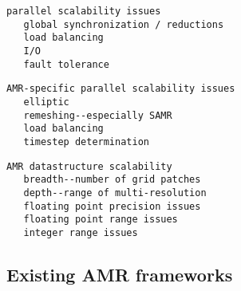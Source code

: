 \documentclass[14pt,letter]{article}
\begin{document}

\begin{verbatim}
parallel scalability issues
   global synchronization / reductions
   load balancing
   I/O
   fault tolerance
\end{verbatim}

\begin{verbatim}
AMR-specific parallel scalability issues
   elliptic
   remeshing--especially SAMR
   load balancing
   timestep determination
\end{verbatim}

\begin{verbatim}
AMR datastructure scalability
   breadth--number of grid patches
   depth--range of multi-resolution
   floating point precision issues
   floating point range issues
   integer range issues
\end{verbatim}

\subsection{Existing AMR frameworks} \label{ss:review}
\end{document}
